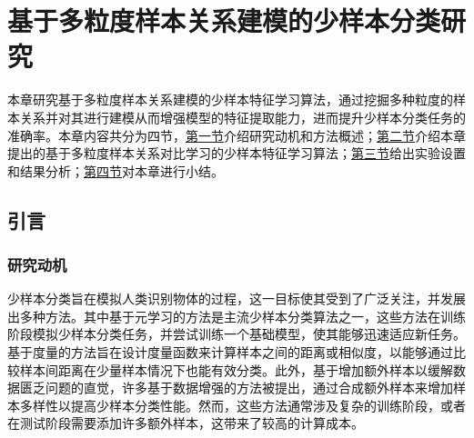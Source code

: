 \chapter[\hspace{0pt}基于多粒度样本关系建模的少样本分类研究]{{\heiti{}\hspace{0pt}基于多粒度样本关系建模的少样本分类研究}}\label{chapter3: 基于多粒度样本关系建模的少样本分类研究}
\removelofgap
\removelotgap
本章研究基于多粒度样本关系建模的少样本特征学习算法，通过挖掘多种粒度的样本关系并对其进行建模从而增强模型的特征提取能力，进而提升少样本分类任务的准确率。本章内容共分为四节，\hyperref[section3: 引言]{第一节}介绍研究动机和方法概述；\hyperref[section3: 基于多粒度样本关系对比学习的少样本特征学习算法]{第二节}介绍本章提出的基于多粒度样本关系对比学习的少样本特征学习算法；\hyperref[section3: 实验设置及结果分析]{第三节}给出实验设置和结果分析；\hyperref[section3: 本章小结]{第四节}对本章进行小结。

\section[\hspace{-2pt}引言]{{\heiti{} \hspace{-8pt}引言}}\label{section3: 引言}

\subsection[\hspace{-2pt}研究动机]{{\heiti{} \hspace{-8pt}研究动机}}\label{section3: 研究动机}

少样本分类旨在模拟人类识别物体的过程，这一目标使其受到了广泛关注，并发展出多种方法。其中基于元学习的方法\cite{MAML, optimization, lee2019meta}是主流少样本分类算法之一，这些方法在训练阶段模拟少样本分类任务，并尝试训练一个基础模型，使其能够迅速适应新任务。基于度量的方法\cite{ProtoNet, vinyals2016matching, DeepEMD, zhu2023light}旨在设计度量函数来计算样本之间的距离或相似度，以能够通过比较样本间距离在少量样本情况下也能有效分类。此外，基于增加额外样本以缓解数据匮乏问题的直觉，许多基于数据增强的方法\cite{IDeMe-Net, DualTriNet, AFHN}被提出，通过合成额外样本来增加样本多样性以提高少样本分类性能。然而，这些方法通常涉及复杂的训练阶段，或者在测试阶段需要添加许多额外样本，这带来了较高的计算成本。

